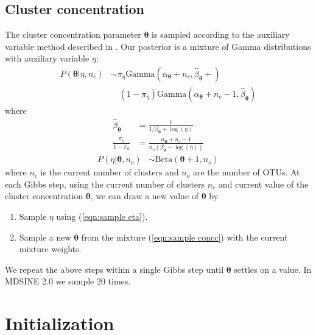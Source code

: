 \documentclass{article}
\newcommand{\Gammadist}{\text{Gamma}}
\newcommand{\Betadist}{\text{Beta}}
\newcommand{\concc}{\mathbf{\theta}}
\begin{document}
\subsection{Cluster concentration}
The cluster concentration parameter $\concc$ is sampled according to the auxiliary variable method described in \cite{cite:escobarandwest1995}. Our posterior is a mixture of Gamma distributions with auxiliary variable $\eta$:
\begin{align}
\label{eqn:sample concc}
    P(\concc | \eta, n_c) & \sim \pi_\eta \Gammadist \left(
        \alpha_\concc + n_c , \hat{\beta}_\concc + \right) \\
        & \quad  (1 - \pi_\eta)\Gammadist \left( 
            \alpha_\concc + n_c - 1, \hat{\beta}_\concc
            \right) \nonumber
\end{align}
where
\begin{align}
    \hat{\beta}_\concc & = \frac{1}{1/\beta_\concc + \log (\eta)} \\
    \frac{\pi_\eta}{1-\pi_\eta} & = \frac
        {\alpha_\concc + n_c - 1}
        {n_o (\beta_\concc - \log (\eta))}
\end{align}
\begin{align}
    \label{eqn:sample eta}
    P(\eta | \concc, n_o) & \sim \Betadist ( \concc + 1, n_o )
\end{align}
where $n_c$ is the current number of clusters and $n_o$ are the number of OTUs. At each Gibbs step, using the current number of clusters $n_c$ and current value of the cluster concentration $\concc$, we can draw a new value of $\concc$ by
\begin{enumerate}
    \item Sample $\eta$ using (\ref{eqn:sample eta}).
    \item Sample a new $\concc$ from the mixture (\ref{eqn:sample concc}) with the current mixture weights.
\end{enumerate}
We repeat the above steps within a single Gibbs step until $\concc$ settles on a value. In MDSINE 2.0 we sample 20 times.


\section{Initialization}
\end{document}
